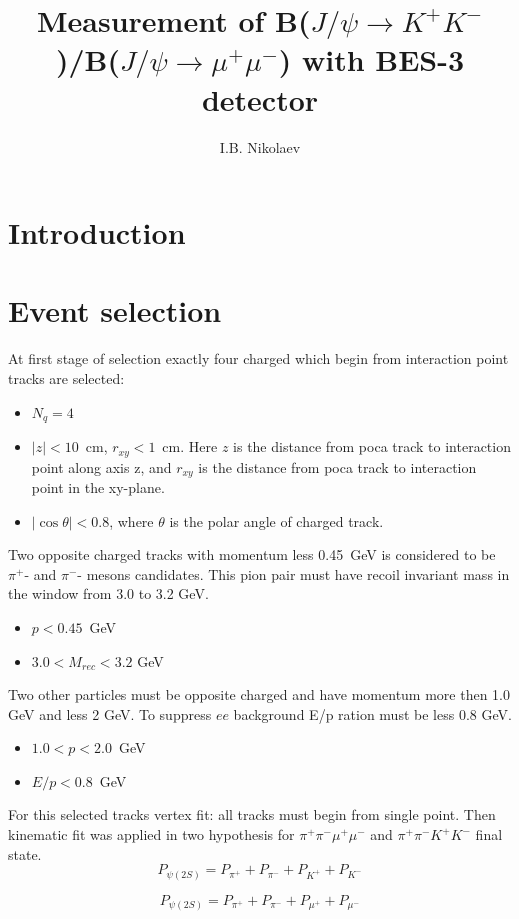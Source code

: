 \documentclass[a4paper,12pt]{article}
\title{Measurement of B($J/\psi \to K^+K^-$)/B($J/\psi \to \mu^+\mu^-$)
with BES-3 detector}
\author{I.B. Nikolaev}
\begin{document}
\maketitle

\section{Introduction}

\section{Event selection}

At first stage of selection exactly four  charged which begin from interaction point tracks are selected:
\begin{itemize}
	\item $N_q = 4$
	\item $|z| <  10$~cm,  $r_{xy} < 1$~cm. Here $z$ is the distance from poca track to interaction point along axis z, 
		and $r_{xy}$ is the distance from poca track to interaction point in the xy-plane.
	\item $|\cos{\theta}|<0.8$, where $\theta$ is the polar angle of charged track.
\end{itemize}


Two opposite charged tracks with momentum less 0.45~GeV is considered to be
$\pi^+$- and $\pi^-$- mesons candidates. This pion pair must have recoil
invariant mass in the window from 3.0 to 3.2 GeV.
\begin{itemize}
	\item $p<0.45$~GeV
	\item $3.0 < M_{rec} < 3.2$ GeV
\end{itemize}

Two other particles must be opposite charged and have momentum more then 1.0
GeV and less 2 GeV. To suppress $ee$ background E/p ration must be less 0.8
GeV.

\begin{itemize}
	\item $1.0<p<2.0$~GeV
	\item $E/p < 0.8$~GeV
\end{itemize}

For this selected tracks vertex fit: all tracks must begin from single point.
Then kinematic fit was applied in two hypothesis for $\pi^+\pi^-\mu^+\mu^-$ and
$\pi^+\pi^-K^+K^-$ final state. 
\[
	P_{\psi(2S)} = P_{\pi^+} +  P_{\pi^-} + P_{K^+} +  P_{K^-}
\]

\[
	P_{\psi(2S)} = P_{\pi^+} +  P_{\pi^-} + P_{\mu^+} +  P_{\mu^-}
\]
\end{document}
